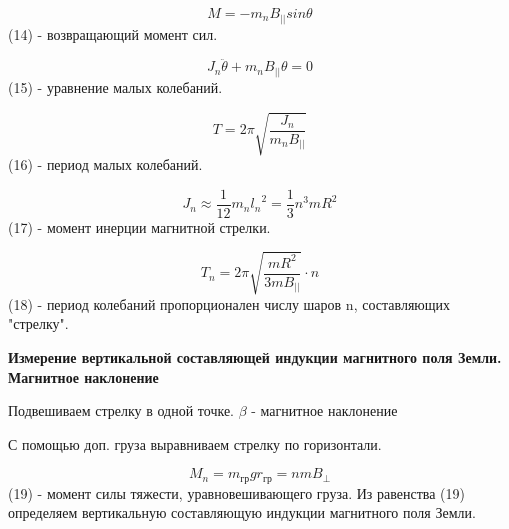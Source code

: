 \documentclass[a4paper,12pt]{article}
\begin{document}

$$ M = -m_nB_{||}sin\theta $$ (14)  - возвращающий момент сил. 

$$ J_n{\ddot{\theta}} + m_nB_{||}\theta = 0 $$ (15) - уравнение малых колебаний. 

$$ T = 2\pi \sqrt{\frac{J_n}{m_nB_{||}}}  $$ (16) - период малых колебаний. 

$$ J_n \approx \frac{1}{12}m_n{l_n}^2 = \frac{1}{3}n^3mR^2  $$ (17) - момент инерции магнитной стрелки. 

$$ T_n = 2\pi\sqrt{\frac{mR^2}{3mB_{||}}} \cdot n $$ (18) - период колебаний пропорционален числу шаров n, составляющих "стрелку". 

\textbf{Измерение вертикальной составляющей индукции магнитного поля Земли. Магнитное наклонение}

Подвешиваем стрелку в одной точке. $\beta$ - магнитное наклонение

С помощью доп. груза выравниваем стрелку по горизонтали.  

$$ M_n = m_{гр}gr_{гр} = nmB_{\perp}  $$ (19) - момент силы тяжести, уравновешивающего груза. 
Из равенства (19) определяем вертикальную составляющую индукции магнитного поля Земли. 

\end{document}
